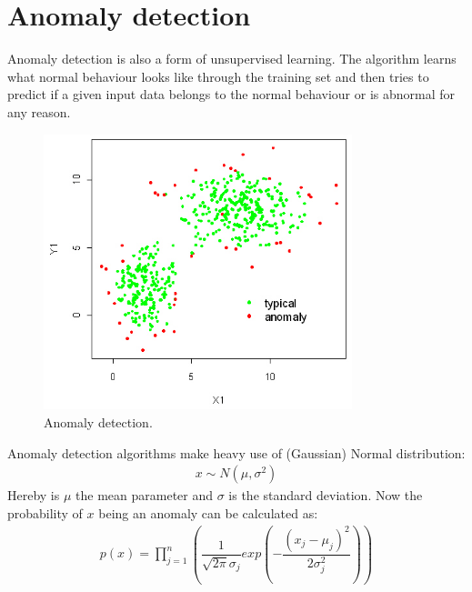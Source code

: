 \section{Anomaly detection}
Anomaly detection is also a form of unsupervised learning. The algorithm learns what normal behaviour looks like through the training set and then tries to predict if a given input data belongs to the normal behaviour or is abnormal for any reason.
\begin{figure}[H]
\centering
\includegraphics[width=0.8\textwidth]{Figures/anomaly}
\decoRule
\caption[Anomaly detection]{Anomaly detection.}
\label{fig:anomalydetection}
\end{figure}
\noindent Anomaly detection algorithms make heavy use of (Gaussian) Normal distribution:
\begin{align}
x \sim N(\mu, \sigma^2)
\end{align}
Hereby is $\mu$ the mean parameter and $\sigma$ is the standard deviation. Now the probability of $x$ being an anomaly can be calculated as:
\begin{align}
p(x) = \prod_{j=1}^n( \dfrac{1}{\sqrt{2\pi}\sigma_j} exp(- \dfrac{(x_j - \mu_j)^2}{2\sigma_j^2}) )
\end{align}

